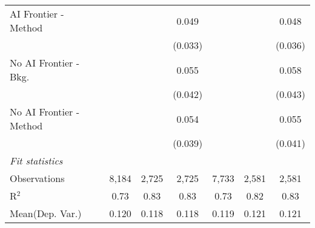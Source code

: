 \begin{tabular}{lcccccc}
   AI Frontier - Method    &              &               & 0.049         &              &               & 0.048\\   
                           &              &               & (0.033)       &              &               & (0.036)\\   
   No AI Frontier - Bkg.   &              &               & 0.055         &              &               & 0.058\\   
                           &              &               & (0.042)       &              &               & (0.043)\\   
   No AI Frontier - Method &              &               & 0.054         &              &               & 0.055\\   
                           &              &               & (0.039)       &              &               & (0.041)\\   
   \midrule
   \emph{Fit statistics}\\
   Observations            & 8,184        & 2,725         & 2,725         & 7,733        & 2,581         & 2,581\\  
   R$^2$                   & 0.73         & 0.83          & 0.83          & 0.73         & 0.82          & 0.83\\  
Mean(Dep. Var.) & 0.120 & 0.118 & 0.118 & 0.119 & 0.121 & 0.121 \\
   

\end{tabular}
